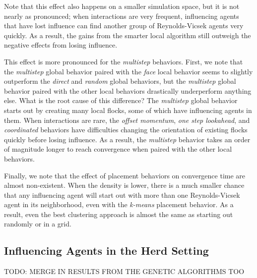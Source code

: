 Note that this effect also happens on a smaller simulation space, but it is
not nearly as pronounced; when interactions are very frequent, influencing
agents that have lost influence can find another group of Reynolds-Vicsek
agents very quickly.
As a result, the gains from the smarter local algorithm still outweigh the
negative effects from losing influence.

This effect is more pronounced for the \textit{multistep} behaviors.
First, we note that the \textit{multistep} global behavior paired with the
\textit{face} local behavior seems to slightly outperform the \textit{direct}
and \textit{random} global behaviors, but the \textit{multistep} global behavior
paired with the other local behaviors drastically underperform anything else.
What is the root cause of this difference?
The \textit{multistep} global behavior starts out by creating many local flocks,
some of which have influencing agents in them.
When interactions are rare, the \textit{offset momentum}, \textit{one step
lookahead}, and \textit{coordinated} behaviors have difficulties changing the
orientation of existing flocks quickly before losing influence.
As a result, the \textit{multistep} behavior takes an order of magnitude longer
to reach convergence when paired with the other local behaviors.

Finally, we note that the effect of placement behaviors on convergence time
are almost non-existent.
When the density is lower, there is a much smaller chance that any influencing
agent will start out with more than one Reynolds-Vicsek agent in its neighborhood,
even with the \textit{k-means} placement behavior.
As a result, even the best clustering approach is almost the same as starting
out randomly or in a grid.

\subsection{Influencing Agents in the Herd Setting}
TODO: MERGE IN RESULTS FROM THE GENETIC ALGORITHMS TOO

